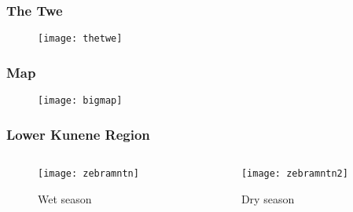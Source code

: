 \documentclass{beamer}
\begin{document}

\begin{frame}
\frametitle{The Twe}
\begin{figure}
\texttt{[image: thetwe]}
\end{figure}
\end{frame}


\begin{frame}
\frametitle{Map}
\begin{figure}
\texttt{[image: bigmap]}
\end{figure}
\end{frame}



\begin{frame}
\frametitle{Lower Kunene Region}

\begin{columns}
\begin{column}{.49\textwidth}
\begin{figure}
\caption{Wet season}
\texttt{[image: zebramntn]}
\end{figure}
\end{column}

\begin{column}{.49\textwidth}
\begin{figure}
\caption{Dry season}
\texttt{[image: zebramntn2]}
\end{figure}
\end{column}
\end{columns}

\end{frame}




\end{document}
